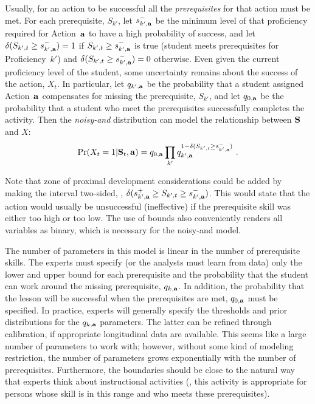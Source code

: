 \documentclass[12pt]{RR-article}
\begin{document}
Usually, for an action to be successful all the {\it prerequisites\/}
for that action must be met.  For each prerequisite, $S_{k'}$, let
$s^{-}_{k',{\bf a}}$ be the minimum level of that proficiency required
for Action~${\bf a}$ to have a high probability of success, and let
$\delta(S_{k',t}\geq s^{-}_{k',{\bf a}})=1$ if $S_{k',t}\geq
s^{-}_{k',{\bf a}}$ is true (student meets prerequisites for
Proficiency~$k'$) and $\delta(S_{k',t}\geq s^{-}_{k',{\bf a}})=0$
otherwise.  Even given the current proficiency level of the student,
some uncertainty remains about the success of the action, $X_t$.
In particular, let $q_{k',{\bf a}}$ be the probability that a student
assigned Action~${\bf a}$ compensates for missing the prerequisite,
$S_{k'}$, and let $q_{0,{\bf a}}$ be the probability that a student who
meet the prerequisites successfully completes the activity.
Then the \textit{noisy-and\/} distribution
\cite{Pearl1988,Junker2001} can model the relationship between ${\bf
S}$ and $X$:
\begin{equation}
\label{eq:effective}
\Pr(X_t=1|{\bf S}_t, {\bf a}) = q_{0,{\bf a}} \prod_{k'} q_{k',{\bf a}}^{1-\delta(S_{k',t}\geq
  s^{-}_{k',{\bf a}})} \ .
\end{equation}

Note that zone of proximal development considerations could be added
by making the interval two-sided, \eg, $\delta(s^{+}_{k',{\bf a}} \geq
S_{k',t}\geq s^{-}_{k',{\bf a}})$.  This would state that the action
would usually be unsuccessful (ineffective) if the prerequisite skill
was either too high or too low.  The use of bounds also conveniently
renders all variables as binary, which is necessary for the noisy-and
model.  

The number of parameters in this model is linear in the number of
prerequisite skills.  The experts must specify (or the analysts must
learn from data) only the lower and upper bound for each prerequisite
and the probability that the student can work around the missing
prerequisite, $q_{k,{\bf a}}$.  In addition, the probability that the
lesson will be successful when the prerequisites are met,
$q_{0,{\bf a}}$ must be specified.  In practice, experts will
generally specify the thresholds and prior distributions for the
$q_{k,{\bf a}}$ parameters. The latter can be refined through
calibration, if appropriate longitudinal data are available.  This
seems like a large number of parameters to work with; however, without
some kind of modeling restriction, the number of parameters grows
exponentially with the number of prerequisites.  Furthermore, the
boundaries should be close to the natural way that experts think
about instructional activities (\ie, this activity is appropriate for
persons whose skill is in this range and who meets these
prerequisites).  
\end{document}
